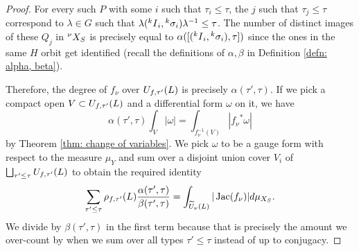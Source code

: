 \documentclass[10pt]{article}
\theoremstyle{plain}
\theoremstyle{definition}
\numberwithin{equation}{section}
\begin{document}
\begin{proof}
For every such $P$ with some $i$ such that $\tau_i \leq \tau$, the $j$ such that $\tau_j \leq \tau$ correspond to $\lambda \in G$ such that $\lambda({^kI}_i,{^k\sigma_i})\lambda^{-1} \leq \tau$. The number of distinct images of these $Q_j$ in ${^\nu X_{S}}$ is precisely equal to $\alpha([({^kI}_i,{^k\sigma_i}),\tau])$ since the ones in the same $H$ orbit get identified (recall the definitions of $\alpha,\beta$ in Definition \ref{defn: alpha, beta}).

Therefore, the degree of $f_\nu$ over $U_{f,\tau'}({L})$ is precisely $\alpha(\tau',\tau)$. If we pick a compact open $V \subset U_{f,\tau'}({L})$ and a differential form $\omega$ on it, we have
\[\alpha(\tau',\tau)\int_{V}|\omega| = \int_{f_{\nu}^{-1}(V)}|{f_{\nu}}^*\omega|\] 
by Theorem \ref{thm: change of variables}. We pick $\omega$ to be a gauge form with respect to the measure $\mu_Y$ and sum over a disjoint union cover $V_i$ of $\bigsqcup_{\tau'\leq \tau}U_{f,\tau'}({L})$ to obtain the required identity
\[\sum_{\tau'\leq \tau}\rho_{f,\tau'}({L})\frac{\alpha(\tau',\tau)}{\beta(\tau',\tau)} = \int_{\widetilde{U}_\nu({L})}|\operatorname{Jac}(f_{\nu})|d\mu_{X_{S}}.\]
We divide by $\beta(\tau',\tau)$ in the first term because that is precisely the amount we over-count by when we sum over all types $\tau' \leq \tau$ instead of up to conjugacy. 
\end{proof}
\end{document}
